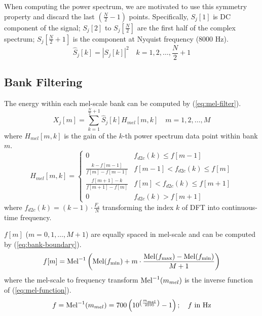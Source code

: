 When computing the power spectrum, we are motivated to use this symmetry property and discard the last $(\frac{N}{2} - 1)$ points. Specifically, $S_j[1]$ is DC component of the signal; $S_j[2]$ to $S_j[\frac{N}{2}]$ are the first half of the complex spectrum; $S_j[\frac{N}{2} + 1]$ is the component at Nyquist frequency (8000 Hz).
\begin{equation}
\label{eq:power-spectrum}
\hat{S}_j[k] = |S_j[k]|^2 \quad k = 1, 2, \dots, \frac{N}{2} + 1
\end{equation}


\subsection{Bank Filtering}

The energy within each mel-scale bank can be computed by (\ref{eq:mel-filter}).
\begin{equation}
\label{eq:mel-filter}
X_j[m] = \sum^{\frac{N}{2} + 1}_{k=1} \hat{S}_j[k] H_{mel}[m, k] \quad m = 1, 2, \dots, M
\end{equation}
where $H_{mel}[m, k]$ is the gain of the $k$-th power spectrum data point within bank $m$.\\

\begin{equation}
\label{eq:mel-bank-gain}
H_{mel}[m, k] =
\begin{cases}
0 &f_{d2c}(k) \le f[m-1]\\
\displaystyle\frac{k - f[m-1]}{f[m] - f[m-1]} &f[m-1] < f_{d2c}(k) \le f[m]\\
\displaystyle\frac{f[m+1] - k}{f[m+1] - f[m]} &f[m] < f_{d2c}(k) \le f[m+1]\\
0 &f_{d2c}(k) > f[m+1]
\end{cases}
\end{equation}
where $f_{d2c}(k) = (k-1) \cdot \frac{F_s}{N}$ transforming the index $k$ of DFT into continuous-time frequency.

$f[m]$ ($m = 0, 1, \dots, M+1$) are equally spaced in mel-scale and can be computed by (\ref{eq:bank-boundary}).
\begin{equation}
\label{eq:bank-boundary}
f[m] = \operatorname{Mel}^{-1} \left( \operatorname{Mel}(f_{\min}) + m \cdot \frac{\operatorname{Mel}(f_{\max}) - \operatorname{Mel}(f_{\min})}{M + 1} \right)
\end{equation}
where the mel-scale to frequency transform $\operatorname{Mel}^{-1}(m_{mel})$ is the inverse function of (\ref{eq:mel-function}).
\begin{equation}
\label{eq:mel-function-inverse}
f = \operatorname{Mel}^{-1}(m_{mel}) = 700 \left( 10^{\left(\frac{m_{mel}}{2595}\right)} - 1 \right); \quad f \text{ in Hz}
\end{equation}

